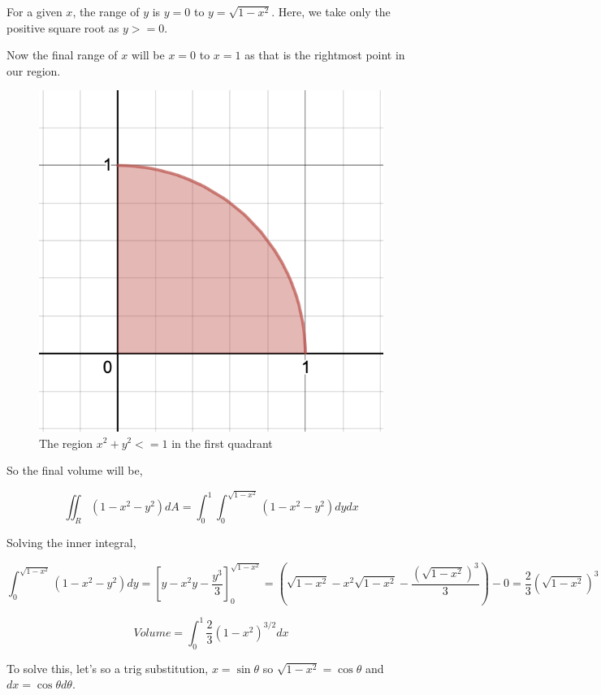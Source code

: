 For a given $x$, the range of $y$ is $y = 0$ to $y = \sqrt{1 - x^2}$. 
Here, we take only the positive square root as $y >= 0$.

Now the final range of $x$ will be $x = 0$ to $x = 1$ as that is the rightmost point in our region.

\begin{figure}[ht!]
    \centering
    \includegraphics[scale=0.5]{./images/lecture_11_figure_2.png}
    \caption{The region $x^2 + y^2 <= 1$ in the first quadrant}
\end{figure}

So the final volume will be,

$$ \iint_R (1-x^2-y^2) dA = \int_0^1 \int_0^{\sqrt{1-x^2}} (1-x^2-y^2) dy dx $$

Solving the inner integral, 

$$ \int_0^{\sqrt{1-x^2}} (1-x^2-y^2) dy 
    = \left[ y - x^2y - \frac{y^3}{3} \right]_0^{\sqrt{1-x^2}}
    = \left( \sqrt{1-x^2} - x^2\sqrt{1-x^2} - \frac{(\sqrt{1-x^2})^3}{3} \right) - 0
    = \frac{2}{3} (\sqrt{1-x^2})^3
$$ 

$$
Volume = \int_0^1 \frac{2}{3} (1-x^2)^{3/2} dx 
$$

To solve this, let's so a trig substitution, $x = \sin \theta$ so $\sqrt{1-x^2} = \cos \theta$ and $dx = \cos \theta d\theta$.

